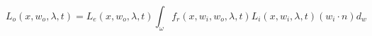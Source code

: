 \documentclass{article}
\begin{document}
\[ L_o(x, w_o, \lambda, t) = L_e(x, w_o, \lambda, t) \int_{\omega} f_r(x,w_i,w_o,\lambda,t) L_i(x,w_i,\lambda,t) (w_i \cdot n) d_w \]
\pagebreak
\end{document}
